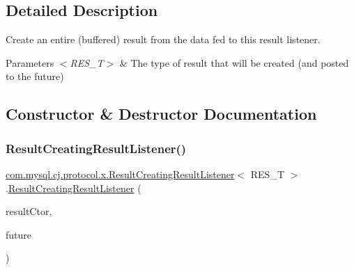 \subsection{Detailed Description}
Create an entire (buffered) result from the data fed to this result listener.


\begin{DoxyParams}{Parameters}
{\em $<$\+R\+E\+S\+\_\+\+T$>$} & The type of result that will be created (and posted to the future) \\
\hline
\end{DoxyParams}


\subsection{Constructor \& Destructor Documentation}
\mbox{\label{classcom_1_1mysql_1_1cj_1_1protocol_1_1x_1_1_result_creating_result_listener_a1ffb4216e90c5ce744b6a13b877e7aca}} 
\subsubsection{\texorpdfstring{Result\+Creating\+Result\+Listener()}{ResultCreatingResultListener()}}
{\footnotesize\ttfamily \mbox{\hyperlink{classcom_1_1mysql_1_1cj_1_1protocol_1_1x_1_1_result_creating_result_listener}{com.\+mysql.\+cj.\+protocol.\+x.\+Result\+Creating\+Result\+Listener}}$<$ R\+E\+S\+\_\+T $>$.\mbox{\hyperlink{classcom_1_1mysql_1_1cj_1_1protocol_1_1x_1_1_result_creating_result_listener}{Result\+Creating\+Result\+Listener}} (\begin{DoxyParamCaption}\item[{Function$<$ \mbox{\hyperlink{interfacecom_1_1mysql_1_1cj_1_1protocol_1_1_column_definition}{Column\+Definition}}, Bi\+Function$<$ \mbox{\hyperlink{interfacecom_1_1mysql_1_1cj_1_1result_1_1_row_list}{Row\+List}}, Supplier$<$ \mbox{\hyperlink{classcom_1_1mysql_1_1cj_1_1protocol_1_1x_1_1_statement_execute_ok}{Statement\+Execute\+Ok}} $>$, R\+E\+S\+\_\+T $>$$>$}]{result\+Ctor,  }\item[{Completable\+Future$<$ R\+E\+S\+\_\+T $>$}]{future }\end{DoxyParamCaption})}



